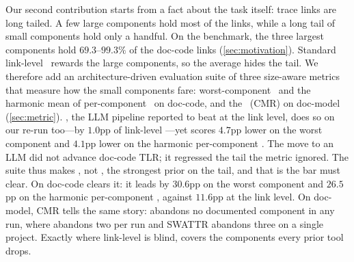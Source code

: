 Our second contribution starts from a fact about the task itself: trace links are long tailed.
A few large components hold most of the links, while a long tail of small components hold only a handful.
On the benchmark, the three largest components hold $69.3$--$99.3\%$ of the doc-code links (\autoref{sec:motivation}).
Standard link-level \fone\ rewards the large components, so the average hides the tail.
We therefore add an architecture-driven evaluation suite of three size-aware metrics that measure how the small components fare: worst-component \fone\ and the harmonic mean of per-component \fone\ on doc-code, and the \cmrname\ (CMR) on doc-model (\autoref{sec:metric}).
\Artemis{}, the \ac{LLM} pipeline reported to beat \TransArc{} at the link level, does so on our re-run too---by $1.0$pp of link-level \fone---yet scores $4.7$pp lower on the worst component and $4.1$pp lower on the harmonic per-component \fone.
The move to an \ac{LLM} did not advance doc-code TLR; it regressed the tail the metric ignored.
The suite thus makes \TransArc{}, not \Artemis{}, the strongest prior on the tail, and that is the bar \approach{} must clear.
On doc-code \approach{} clears it: it leads \TransArc{} by $30.6$pp on the worst component and $26.5$pp on the harmonic per-component \fone, against $11.6$pp at the link level.
On doc-model, CMR tells the same story: \approach{} abandons no documented component in any run, where \Artemis{} abandons two per run and SWATTR abandons three on a single project.
Exactly where link-level \fone{} is blind, \approach{} covers the components every prior tool drops.

